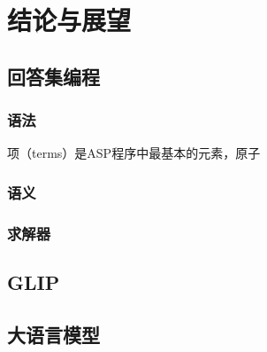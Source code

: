 \chapter{结论与展望}
\section{回答集编程}
\subsection{语法}
项（terms）是ASP程序中最基本的元素，原子
\subsection{语义}
\subsection{求解器}
\section{GLIP}
\section{大语言模型}